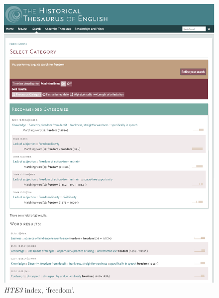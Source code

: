 \begin{figure}[htbp]
  \centering
    \includegraphics[width=\linewidth]{Stolk_thes-content/fig/thes/HTE3-index-freedom.png}
  \caption{\textit{HTE3} index, `freedom'.}
  \label{fig:1.A:HTE3:index}
\end{figure}



